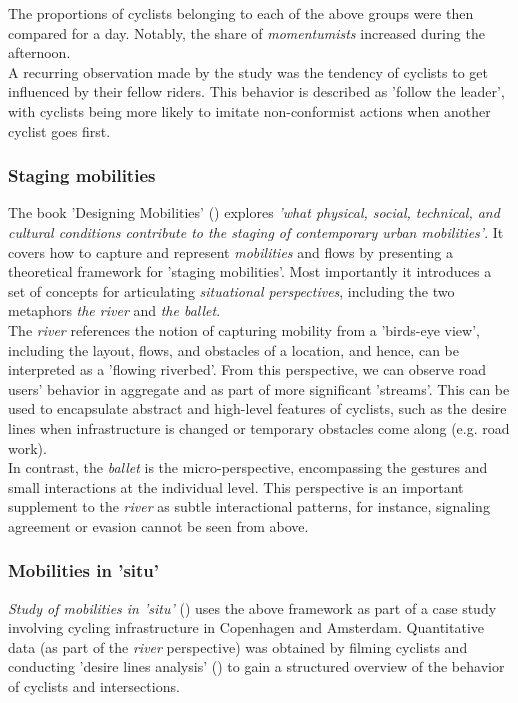 The proportions of cyclists belonging to each of the above groups were then compared for a day. 
Notably, the share of \textit{momentumists} increased during the afternoon.
 \ \\

A recurring observation made by the study was the tendency of cyclists to get influenced by their fellow riders. 
This behavior is described as 'follow the leader', with cyclists being more likely to imitate non-conformist 
actions when another cyclist goes first. 

\subsubsection{Staging mobilities}
The book 'Designing Mobilities' (\cite{designinig_mobilities}) explores \textit{'what physical, social, technical, 
and cultural conditions contribute to the staging of contemporary urban mobilities'}.
It covers how to capture and represent \textit{mobilities} and flows by presenting a theoretical framework for 'staging mobilities'. 
Most importantly it introduces a set of concepts for articulating \textit{situational perspectives}, 
including the two metaphors \textit{the river} and \textit{the ballet}. 
 \ \\

 The \textit{river} references the notion of capturing mobility from a 'birds-eye view', including the layout, 
 flows, and obstacles of a location, and hence, can be interpreted as a 'flowing riverbed'. 
 From this perspective, we can observe road users' behavior in aggregate and as part of more significant 'streams'. 
 This can be used to encapsulate abstract and high-level features of cyclists, such as the desire lines
 when infrastructure is changed or temporary obstacles come along (e.g. road work).
 \ \\

In contrast, the \textit{ballet} is the micro-perspective, encompassing the gestures and small interactions at the individual level.
This perspective is an important supplement to the \textit{river} as subtle interactional patterns, for instance,
 signaling agreement or evasion cannot be seen from above.

\subsubsection{Mobilities in 'situ'}
\textit{Study of mobilities in 'situ'} (\cite{situ}) uses the above framework as part of a case study involving cycling infrastructure in 
Copenhagen and Amsterdam. Quantitative data (as part of the \textit{river} perspective) was obtained by filming cyclists and conducting 
'desire lines analysis' (\cite{cva}) to gain a structured overview of the behavior of cyclists and intersections. 
\ \\


